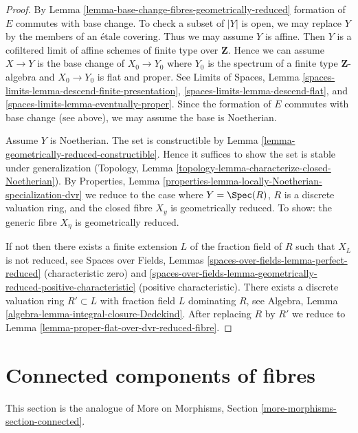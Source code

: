 \begin{proof}
By Lemma \ref{lemma-base-change-fibres-geometrically-reduced}
formation of $E$ commutes with base change. To check a subset
of $|Y|$ is open, we may replace $Y$ by the members of an
\'etale covering. Thus we may assume $Y$ is affine.
Then $Y$ is a cofiltered limit of affine
schemes of finite type over $\mathbf{Z}$.
Hence we can assume $X \to Y$ is the
base change of $X_0 \to Y_0$ where $Y_0$ is the spectrum of a finite
type $\mathbf{Z}$-algebra and $X_0 \to Y_0$ is flat and proper.
See Limits of Spaces, Lemma
\ref{spaces-limits-lemma-descend-finite-presentation},
\ref{spaces-limits-lemma-descend-flat}, and
\ref{spaces-limits-lemma-eventually-proper}. Since the formation of
$E$ commutes with base change (see above),
we may assume the base is Noetherian.

\medskip\noindent
Assume $Y$ is Noetherian. The set is constructible by
Lemma \ref{lemma-geometrically-reduced-constructible}.
Hence it suffices to show the set is stable under generalization
(Topology, Lemma \ref{topology-lemma-characterize-closed-Noetherian}). By
Properties, Lemma \ref{properties-lemma-locally-Noetherian-specialization-dvr}
we reduce to the case where $Y = \Spec(R)$, $R$ is a discrete
valuation ring, and the closed fibre $X_y$ is geometrically
reduced. To show: the generic fibre $X_\eta$ is geometrically reduced.

\medskip\noindent
If not then there exists a finite extension $L$ of the fraction
field of $R$ such that $X_L$ is not reduced, see
Spaces over Fields, Lemmas
\ref{spaces-over-fields-lemma-perfect-reduced} (characteristic zero) and
\ref{spaces-over-fields-lemma-geometrically-reduced-positive-characteristic}
(positive characteristic). There exists a discrete valuation ring
$R' \subset L$ with fraction field $L$ dominating $R$, see
Algebra, Lemma \ref{algebra-lemma-integral-closure-Dedekind}.
After replacing $R$ by $R'$ we reduce to
Lemma \ref{lemma-proper-flat-over-dvr-reduced-fibre}.
\end{proof}







\section{Connected components of fibres}
\label{section-connected}

\noindent
This section is the analogue of
More on Morphisms, Section \ref{more-morphisms-section-connected}.

